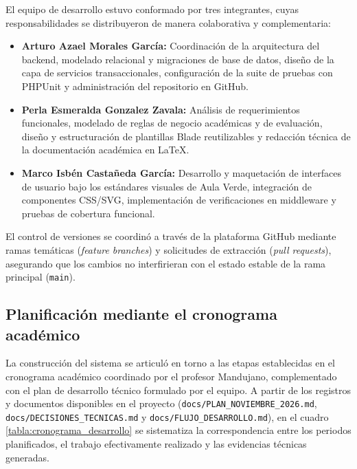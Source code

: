 El equipo de desarrollo estuvo conformado por tres integrantes, cuyas responsabilidades se distribuyeron de manera colaborativa y complementaria:

\begin{itemize}
    \item \textbf{Arturo Azael Morales García:} Coordinación de la arquitectura del backend, modelado relacional y migraciones de base de datos, diseño de la capa de servicios transaccionales, configuración de la suite de pruebas con PHPUnit y administración del repositorio en GitHub.
    \item \textbf{Perla Esmeralda Gonzalez Zavala:} Análisis de requerimientos funcionales, modelado de reglas de negocio académicas y de evaluación, diseño y estructuración de plantillas Blade reutilizables y redacción técnica de la documentación académica en LaTeX.
    \item \textbf{Marco Isbén Castañeda García:} Desarrollo y maquetación de interfaces de usuario bajo los estándares visuales de Aula Verde, integración de componentes CSS/SVG, implementación de verificaciones en middleware y pruebas de cobertura funcional.
\end{itemize}

El control de versiones se coordinó a través de la plataforma GitHub mediante ramas temáticas (\textit{feature branches}) y solicitudes de extracción (\textit{pull requests}), asegurando que los cambios no interfirieran con el estado estable de la rama principal (\texttt{main}).

\subsection{Planificación mediante el cronograma académico}
\label{sec:cronograma_academico}

La construcción del sistema se articuló en torno a las etapas establecidas en el cronograma académico coordinado por el profesor Mandujano, complementado con el plan de desarrollo técnico formulado por el equipo. A partir de los registros y documentos disponibles en el proyecto (\texttt{docs/PLAN\_NOVIEMBRE\_2026.md}, \texttt{docs/DECISIONES\_TECNICAS.md} y \texttt{docs/FLUJO\_DESARROLLO.md}), en el cuadro \ref{tabla:cronograma_desarrollo} se sistematiza la correspondencia entre los periodos planificados, el trabajo efectivamente realizado y las evidencias técnicas generadas.

